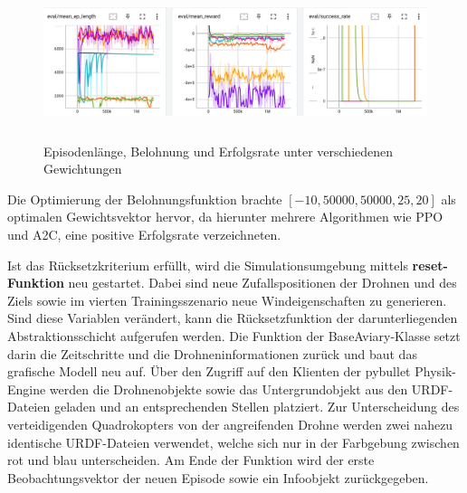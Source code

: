 \begin{figure}[htb]
    \centering
    \includegraphics[height=4.5cm]{lib/graphics/speed_reward_logs.png}
    \caption[Episodenlänge, Belohnung und Erfolgsrate unter verschiedenen Gewichtungen]{Episodenlänge, Belohnung und Erfolgsrate unter verschiedenen Gewichtungen\footnotemark}
    \label{abb:reward-logs}
\end{figure}

Die Optimierung der Belohnungsfunktion brachte $[-10, 50000, 50000, 25, 20]$ als optimalen Gewichtsvektor hervor, da hierunter mehrere Algorithmen wie PPO und A2C, eine positive Erfolgsrate verzeichneten.

Ist das Rücksetzkriterium erfüllt, wird die Simulationsumgebung mittels \textbf{reset-Funktion} neu gestartet.
Dabei sind neue Zufallspositionen der Drohnen und des Ziels sowie im vierten Trainingsszenario neue Windeigenschaften zu generieren.
Sind diese Variablen verändert, kann die Rücksetzfunktion der darunterliegenden Abstraktionsschicht aufgerufen werden.
Die Funktion der BaseAviary-Klasse setzt darin die Zeitschritte und die Drohneninformationen zurück und baut das grafische Modell neu auf.
Über den Zugriff auf den Klienten der pybullet Physik-Engine werden die Drohnenobjekte sowie das Untergrundobjekt aus den URDF-Dateien geladen und an entsprechenden Stellen platziert.
Zur Unterscheidung des verteidigenden Quadrokopters von der angreifenden Drohne werden zwei nahezu identische URDF-Dateien verwendet, welche sich nur in der Farbgebung zwischen rot und blau unterscheiden.
Am Ende der Funktion wird der erste Beobachtungsvektor der neuen Episode sowie ein Infoobjekt zurückgegeben.

